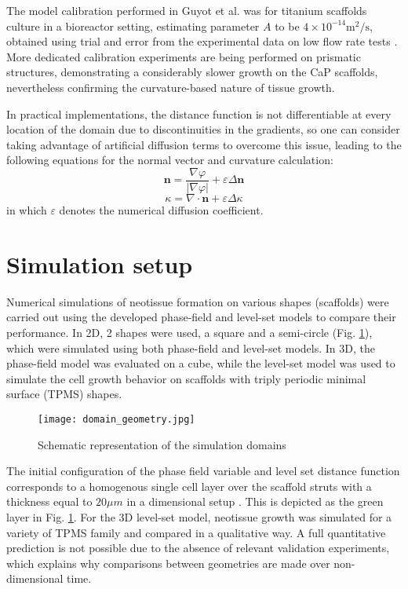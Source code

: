 The model calibration performed in Guyot et al. \cite{Guyot2014} was for titanium scaffolds culture in a bioreactor setting, estimating parameter $A$ to be $4\times10^{-14} \text{m}^2/\text{s}$, obtained using trial and error from the experimental data on low flow rate tests \cite{Papantoniou2014}.
More dedicated calibration experiments are being performed on prismatic structures, demonstrating a considerably slower growth on the CaP scaffolds, nevertheless confirming the curvature-based nature of tissue growth.

In practical implementations, the distance function is not differentiable at every location of the domain due to discontinuities in the gradients, so one can consider taking advantage of artificial diffusion terms to overcome this issue, leading to the following equations for the normal vector and curvature calculation:
\begin{equation}
\boldsymbol{n}=\frac{\nabla \varphi}{|\nabla \varphi|}+\varepsilon \Delta \boldsymbol{n}
\end{equation}
\begin{equation}
\kappa=\nabla \cdot \boldsymbol{n}+\varepsilon \Delta \kappa
\end{equation}
in which $\varepsilon$ denotes the numerical diffusion coefficient.


\section{Simulation setup}

Numerical simulations of neotissue formation on various shapes (scaffolds) were carried out using the developed phase-field and level-set models to compare their performance. In 2D, 2 shapes were used, a square and a semi-circle (Fig. \ref{fig:tissue_domain_geometry}), which were simulated using both phase-field and level-set models. In 3D, the phase-field model was evaluated on a cube, while the level-set model was used to simulate the cell growth behavior on scaffolds with triply periodic minimal surface (TPMS) shapes. 

\begin{figure}
\medskip
\centering
\texttt{[image: domain\_geometry.jpg]}
\caption[Schematic representation of the simulation domains]{Schematic representation of the simulation domains}
\label{fig:tissue_domain_geometry}
\end{figure}

The initial configuration of the phase field variable and level set distance function corresponds to a homogenous single cell layer over the scaffold struts with a thickness equal to $20 \mu m$ in a dimensional setup \cite{Darling2008}. This is depicted as the green layer in Fig. \ref{fig:tissue_domain_geometry}. For the 3D level-set model, neotissue growth was simulated for a variety of TPMS family and compared in a qualitative way. A full quantitative prediction is not possible due to the absence of relevant validation experiments, which explains why comparisons between geometries are made over non-dimensional time. 

